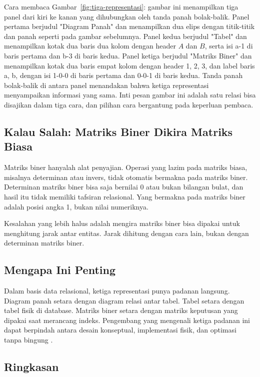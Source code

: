 \documentclass[11pt,a4paper]{article}
\begin{document}
Cara membaca Gambar~\ref{fig:tiga-representasi}: gambar ini menampilkan tiga panel dari kiri ke kanan yang dihubungkan oleh tanda panah bolak-balik. Panel pertama berjudul "Diagram Panah" dan menampilkan dua elips dengan titik-titik dan panah seperti pada gambar sebelumnya. Panel kedua berjudul "Tabel" dan menampilkan kotak dua baris dua kolom dengan header $A$ dan $B$, serta isi a-1 di baris pertama dan b-3 di baris kedua. Panel ketiga berjudul "Matriks Biner" dan menampilkan kotak dua baris empat kolom dengan header 1, 2, 3, dan label baris a, b, dengan isi 1-0-0 di baris pertama dan 0-0-1 di baris kedua. Tanda panah bolak-balik di antara panel menandakan bahwa ketiga representasi menyampaikan informasi yang sama. Inti pesan gambar ini adalah satu relasi bisa disajikan dalam tiga cara, dan pilihan cara bergantung pada keperluan pembaca.

\subsection{Kalau Salah: Matriks Biner Dikira Matriks Biasa}

Matriks biner hanyalah alat penyajian. Operasi yang lazim pada matriks biasa, misalnya determinan atau invers, tidak otomatis bermakna pada matriks biner. Determinan matriks biner bisa saja bernilai 0 atau bukan bilangan bulat, dan hasil itu tidak memiliki tafsiran relasional. Yang bermakna pada matriks biner adalah posisi angka 1, bukan nilai numeriknya.

Kesalahan yang lebih halus adalah mengira matriks biner bisa dipakai untuk menghitung jarak antar entitas. Jarak dihitung dengan cara lain, bukan dengan determinan matriks biner.

\subsection{Mengapa Ini Penting}

Dalam basis data relasional, ketiga representasi punya padanan langsung. Diagram panah setara dengan diagram relasi antar tabel. Tabel setara dengan tabel fisik di database. Matriks biner setara dengan matriks keputusan yang dipakai saat merancang indeks. Pengembang yang mengenali ketiga padanan ini dapat berpindah antara desain konseptual, implementasi fisik, dan optimasi tanpa bingung \cite{date}.

\subsection{Ringkasan}
\end{document}
